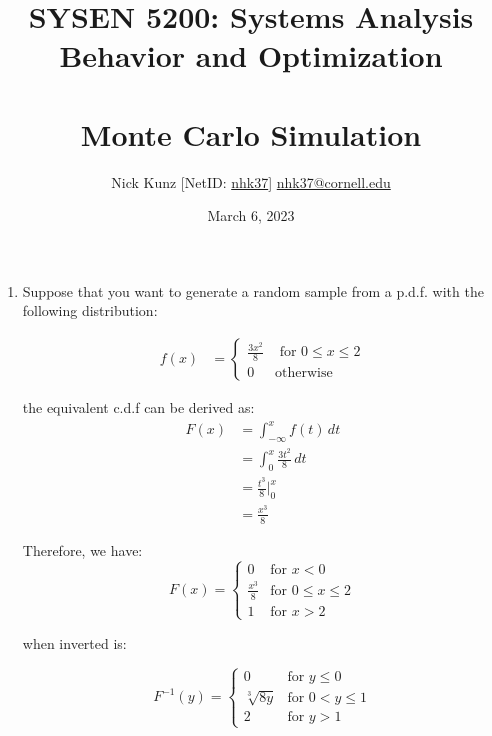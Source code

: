 \documentclass{article}
\begin{document}
\title{SYSEN 5200: Systems Analysis Behavior and Optimization\\~\\
    \Large Monte Carlo Simulation
}
\author{
    Nick Kunz [NetID: \url{nhk37}] \hyperlink{nhk37@cornell.edu}{nhk37@cornell.edu}}
\date{March 6, 2023}
\maketitle
\thispagestyle{fancy}

\begin{enumerate}

    \item Suppose that you want to generate a random sample from a p.d.f. with the following distribution:

    \begin{equation}
        \begin{split}
            f(x) &= \begin{cases}
                \frac{3x^{2}}{8} & \text{ for } 0 \leq x \leq 2\\
                0 & \text{otherwise}
            \end{cases}
        \end{split}
    \end{equation}

    the equivalent c.d.f can be derived as:
    \begin{equation}
        \begin{split}
            F(x) &= \int_{-\infty}^{x} f(t)\, dt\\
            &= \int_{0}^{x} \frac{3t^{2}}{8}\, dt\\
            &= \frac{t^{3}}{8}\Big|_{0}^{x}\\
            &= \frac{x^{3}}{8}
        \end{split}
    \end{equation}

    Therefore, we have:
    \begin{equation}
        F(x) = \begin{cases}
        0 & \text{for } x<0 \\
        \frac{x^{3}}{8} & \text{for } 0 \leq x \leq 2 \\
        1 & \text{for } x>2
    \end{cases}
    \end{equation}

    when inverted is:

    \begin{equation}
        F^{-1}(y) = \begin{cases}
        0 & \text{for } y \leq 0 \\
        \sqrt[3]{8y} & \text{for } 0 < y \leq 1 \\              
        2 & \text{for } y > 1
        \end{cases}
        \end{equation}\\


\end{enumerate}
\end{document}

